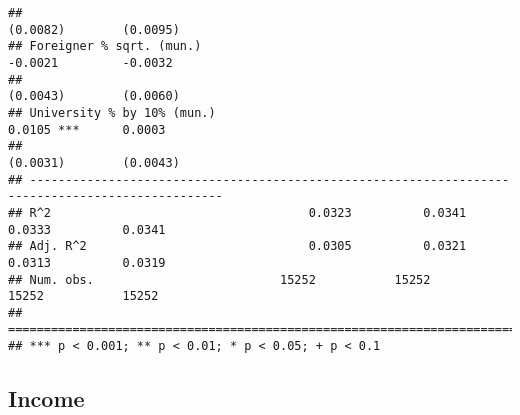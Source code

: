 \documentclass[
]{article}
\begin{document}
\begin{verbatim}
##                                                                       (0.0082)        (0.0095)   
## Foreigner % sqrt. (mun.)                                              -0.0021         -0.0032    
##                                                                       (0.0043)        (0.0060)   
## University % by 10% (mun.)                                             0.0105 ***      0.0003    
##                                                                       (0.0031)        (0.0043)   
## -------------------------------------------------------------------------------------------------
## R^2                                    0.0323          0.0341          0.0333          0.0341    
## Adj. R^2                               0.0305          0.0321          0.0313          0.0319    
## Num. obs.                          15252           15252           15252           15252         
## =================================================================================================
## *** p < 0.001; ** p < 0.01; * p < 0.05; + p < 0.1
\end{verbatim}

\hypertarget{income-1}{%
\subsection{Income}\label{income-1}}
\end{document}
